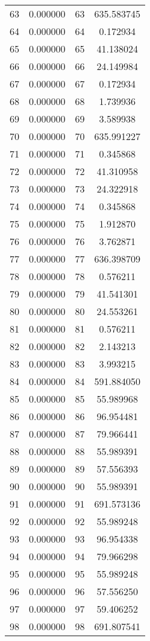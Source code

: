 \documentclass[12pt]{article}
\begin{document}
\begin{longtable}{@{}cccc@{}}
63 & 0.000000 & 63 & 635.583745 \\
64 & 0.000000 & 64 & 0.172934 \\
65 & 0.000000 & 65 & 41.138024 \\
66 & 0.000000 & 66 & 24.149984 \\
67 & 0.000000 & 67 & 0.172934 \\
68 & 0.000000 & 68 & 1.739936 \\
69 & 0.000000 & 69 & 3.589938 \\
70 & 0.000000 & 70 & 635.991227 \\
71 & 0.000000 & 71 & 0.345868 \\
72 & 0.000000 & 72 & 41.310958 \\
73 & 0.000000 & 73 & 24.322918 \\
74 & 0.000000 & 74 & 0.345868 \\
75 & 0.000000 & 75 & 1.912870 \\
76 & 0.000000 & 76 & 3.762871 \\
77 & 0.000000 & 77 & 636.398709 \\
78 & 0.000000 & 78 & 0.576211 \\
79 & 0.000000 & 79 & 41.541301 \\
80 & 0.000000 & 80 & 24.553261 \\
81 & 0.000000 & 81 & 0.576211 \\
82 & 0.000000 & 82 & 2.143213 \\
83 & 0.000000 & 83 & 3.993215 \\
84 & 0.000000 & 84 & 591.884050 \\
85 & 0.000000 & 85 & 55.989968 \\
86 & 0.000000 & 86 & 96.954481 \\
87 & 0.000000 & 87 & 79.966441 \\
88 & 0.000000 & 88 & 55.989391 \\
89 & 0.000000 & 89 & 57.556393 \\
90 & 0.000000 & 90 & 55.989391 \\
91 & 0.000000 & 91 & 691.573136 \\
92 & 0.000000 & 92 & 55.989248 \\
93 & 0.000000 & 93 & 96.954338 \\
94 & 0.000000 & 94 & 79.966298 \\
95 & 0.000000 & 95 & 55.989248 \\
96 & 0.000000 & 96 & 57.556250 \\
97 & 0.000000 & 97 & 59.406252 \\
98 & 0.000000 & 98 & 691.807541 \\

\end{longtable}
\end{document}
